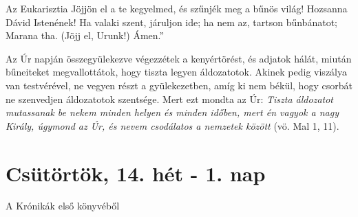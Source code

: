 \documentclass[twoside]{article}
\begin{document}
\begin{lectio}{Az Eukarisztia}
Jöjjön el a te kegyelmed, és szűnjék meg a bűnös világ! Hozsanna Dávid Istenének! Ha valaki szent, járuljon ide; ha nem az, tartson bűnbánatot; Marana tha. (Jöjj el, Urunk!) Ámen.”

Az Úr napján összegyülekezve végezzétek a kenyértörést, és adjatok hálát, miután bűneiteket megvallottátok, hogy tiszta legyen áldozatotok. Akinek pedig viszálya van testvérével, ne vegyen részt a gyülekezetben, amíg ki nem békül, hogy csorbát ne szenvedjen áldozatotok szentsége. Mert ezt mondta az Úr: \textit{Tiszta áldozatot mutassanak be nekem minden helyen és minden időben, mert én vagyok a nagy Király, úgymond az Úr, és nevem csodálatos a nemzetek között} (vö. Mal 1, 11).
\end{lectio}



\section*{Csütörtök, 14. hét - 1. nap}

A Krónikák első könyvéből
\end{document}
